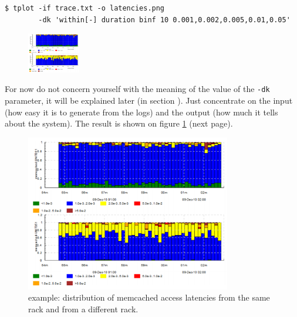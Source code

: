 \documentclass{article}
\begin{document}
\begin{verbatim}
$ tplot -if trace.txt -o latencies.png
        -dk 'within[-] duration binf 10 0.001,0.002,0.005,0.01,0.05'
\end{verbatim}

\begin{figure}
\vspace{-25pt}
\center
\includegraphics[height=50pt]{pics/tplot/tplot-motivating-example.png}
\end{figure}

For now do not concern yourself with the meaning of the value of the \verb|-dk| parameter, it will be explained later (in section ). Just concentrate on the input (how easy it is to generate from the logs) and the output (how much it tells about the system). The result is shown on figure \ref{fig:tplot-motivating-example} (next page).

\pagebreak

\begin{figure}[h]
\center
\includegraphics[width=0.8\textwidth]{pics/tplot/tplot-motivating-example.png}
\caption{\timeplot{} example: distribution of memcached access latencies from the same rack and from a different rack.}
\label{fig:tplot-motivating-example}
\end{figure}
\end{document}
